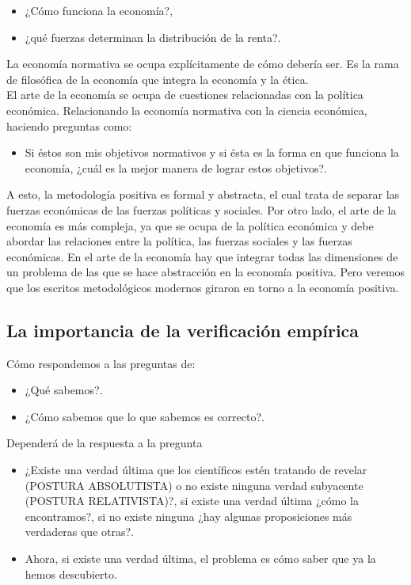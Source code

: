 \documentclass[10pt]{book}
\begin{document}
\begin{itemize}
    \item ¿Cómo funciona la economía?,
    \item ¿qué fuerzas determinan la distribución de la renta?.
\end{itemize}

La economía normativa se ocupa explícitamente de cómo debería ser. Es la rama de filosófica de la economía que integra la economía y la ética.\\

El arte de la economía se ocupa de cuestiones relacionadas con la política económica. Relacionando la economía normativa con la ciencia económica, haciendo preguntas como:

\begin{itemize}
    \item Si éstos son mis objetivos normativos y si ésta es la forma en que funciona la economía, ¿cuál es la mejor manera de lograr estos objetivos?.
\end{itemize}

A esto, la metodología positiva es formal y abstracta, el cual trata de separar las fuerzas económicas de las fuerzas políticas y sociales. Por otro lado, el arte de la economía es más compleja, ya que se ocupa de la política económica y debe abordar las relaciones entre la política, las fuerzas sociales y las fuerzas económicas. En el arte de la economía hay que integrar todas las dimensiones de un problema de las que se hace abstracción en la economía positiva. Pero veremos que los escritos metodológicos modernos giraron en torno a la economía positiva.


\subsection{La importancia de la verificación empírica}
Cómo respondemos a las preguntas de:

\begin{itemize}
    \item ¿Qué sabemos?.
    \item ¿Cómo sabemos que lo que sabemos es correcto?.
\end{itemize}

Dependerá de la respuesta a la pregunta

\begin{itemize}
    \item ¿Existe una verdad última que los científicos estén tratando de revelar (POSTURA ABSOLUTISTA) o no existe ninguna verdad subyacente (POSTURA RELATIVISTA)?, si existe una verdad última ¿cómo la encontramos?, si no existe ninguna ¿hay algunas proposiciones más verdaderas que otras?.
    \item Ahora, si existe una verdad última, el problema es cómo saber que ya la hemos descubierto.
\end{itemize}
\end{document}
